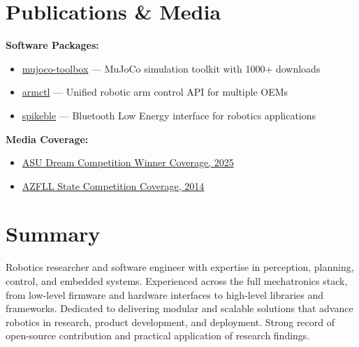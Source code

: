 \documentclass[10pt]{article}
\begin{document}
\section*{Publications \& Media}
\textbf{Software Packages:}
\begin{itemize}
  \item \href{https://pypi.org/project/mujoco-toolbox/}{mujoco-toolbox} --- MuJoCo simulation toolkit with 1000+ downloads
  \item \href{https://pypi.org/project/armctl/}{armctl} --- Unified robotic arm control API for multiple OEMs
  \item \href{https://pypi.org/project/spikeble/}{spikeble} --- Bluetooth Low Energy interface for robotics applications
\end{itemize}

\textbf{Media Coverage:}
\begin{itemize}
  \item \href{https://www.linkedin.com/posts/school-of-manufacturing-systems-and-networks_asuengineering-design-robotics-activity-7324208506419453957-uM9B}{ASU Dream Competition Winner Coverage, 2025}
  \item \href{https://theeagleangle.blogspot.com/2014/12/foothills-lego-robotics-team-wins-azfll.html}{AZFLL State Competition Coverage, 2014}
\end{itemize}

\section*{Summary}
Robotics researcher and software engineer with expertise in perception, planning, control, and embedded systems. Experienced across the full mechatronics stack, from low-level firmware and hardware interfaces to high-level libraries and frameworks. Dedicated to delivering modular and scalable solutions that advance robotics in research, product development, and deployment. Strong record of open-source contribution and practical application of research findings.
\end{document}

